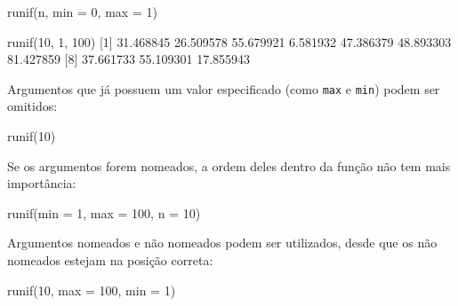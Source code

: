 \documentclass[
  10pt,
  a4paper]{book}
\newenvironment{Shaded}{\begin{snugshade}}{\end{snugshade}}
\newcommand{\AttributeTok}[1]{\textcolor[rgb]{0.77,0.63,0.00}{#1}}
\newcommand{\DecValTok}[1]{\textcolor[rgb]{0.00,0.00,0.81}{#1}}
\newcommand{\FloatTok}[1]{\textcolor[rgb]{0.00,0.00,0.81}{#1}}
\newcommand{\FunctionTok}[1]{\textcolor[rgb]{0.00,0.00,0.00}{#1}}
\newcommand{\NormalTok}[1]{#1}
\begin{document}
\begin{Shaded}
\begin{Highlighting}[]
\FunctionTok{runif}\NormalTok{(n, }\AttributeTok{min =} \DecValTok{0}\NormalTok{, }\AttributeTok{max =} \DecValTok{1}\NormalTok{)}
\end{Highlighting}
\end{Shaded}

\begin{Shaded}
\begin{Highlighting}[]
\FunctionTok{runif}\NormalTok{(}\DecValTok{10}\NormalTok{, }\DecValTok{1}\NormalTok{, }\DecValTok{100}\NormalTok{)}
\NormalTok{ [}\DecValTok{1}\NormalTok{] }\FloatTok{31.468845} \FloatTok{26.509578} \FloatTok{55.679921}  \FloatTok{6.581932} \FloatTok{47.386379} \FloatTok{48.893303} \FloatTok{81.427859}
\NormalTok{ [}\DecValTok{8}\NormalTok{] }\FloatTok{37.661733} \FloatTok{55.109301} \FloatTok{17.855943}
\end{Highlighting}
\end{Shaded}

Argumentos que já possuem um valor especificado (como \texttt{max} e \texttt{min})
podem ser omitidos:

\begin{Shaded}
\begin{Highlighting}[]
\FunctionTok{runif}\NormalTok{(}\DecValTok{10}\NormalTok{)}
\end{Highlighting}
\end{Shaded}

Se os argumentos forem nomeados, a ordem deles dentro da função não tem
mais importância:

\begin{Shaded}
\begin{Highlighting}[]
\FunctionTok{runif}\NormalTok{(}\AttributeTok{min =} \DecValTok{1}\NormalTok{, }\AttributeTok{max =} \DecValTok{100}\NormalTok{, }\AttributeTok{n =} \DecValTok{10}\NormalTok{)}
\end{Highlighting}
\end{Shaded}

Argumentos nomeados e não nomeados podem ser utilizados, desde que os
não nomeados estejam na posição correta:

\begin{Shaded}
\begin{Highlighting}[]
\FunctionTok{runif}\NormalTok{(}\DecValTok{10}\NormalTok{, }\AttributeTok{max =} \DecValTok{100}\NormalTok{, }\AttributeTok{min =} \DecValTok{1}\NormalTok{)}
\end{Highlighting}
\end{Shaded}
\end{document}
